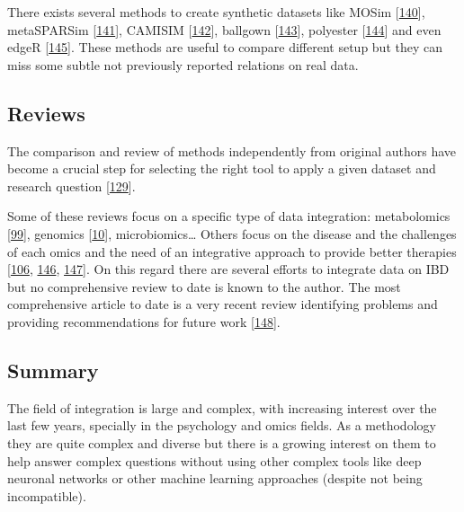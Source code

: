\documentclass[
  12pt,
  a4paper,
  twoside,
  openright]{book}
\begin{document}
There exists several methods to create synthetic datasets like MOSim {[}\protect\hyperlink{ref-martuxednez-mira2018}{140}{]}, metaSPARSim {[}\protect\hyperlink{ref-patuzzi2019}{141}{]}, CAMISIM {[}\protect\hyperlink{ref-fritz2019}{142}{]}, ballgown {[}\protect\hyperlink{ref-fu2021}{143}{]}, polyester {[}\protect\hyperlink{ref-frazee2021}{144}{]} and even edgeR {[}\protect\hyperlink{ref-mccarthy2012}{145}{]}.
These methods are useful to compare different setup but they can miss some subtle not previously reported relations on real data.

\hypertarget{reviews}{%
\subsection{Reviews}\label{reviews}}

The comparison and review of methods independently from original authors have become a crucial step for selecting the right tool to apply a given dataset and research question {[}\protect\hyperlink{ref-cantini2021}{129}{]}.

Some of these reviews focus on a specific type of data integration: metabolomics {[}\protect\hyperlink{ref-cavill2016}{99}{]}, genomics {[}\protect\hyperlink{ref-mcgovern2015}{10}{]}, microbiomics\ldots{} Others focus on the disease and the challenges of each omics and the need of an integrative approach to provide better therapies {[}\protect\hyperlink{ref-tarazona2021}{106}, \protect\hyperlink{ref-de_souza_ibd_2017}{146}, \protect\hyperlink{ref-valles-colomer2016}{147}{]}.
On this regard there are several efforts to integrate data on IBD but no comprehensive review to date is known to the author.
The most comprehensive article to date is a very recent review identifying problems and providing recommendations for future work {[}\protect\hyperlink{ref-sudhakar2022}{148}{]}.

\hypertarget{methods-integration}{%
\subsection{Summary}\label{methods-integration}}

The field of integration is large and complex, with increasing interest over the last few years, specially in the psychology and omics fields.
As a methodology they are quite complex and diverse but there is a growing interest on them to help answer complex questions without using other complex tools like deep neuronal networks or other machine learning approaches (despite not being incompatible).
\end{document}
